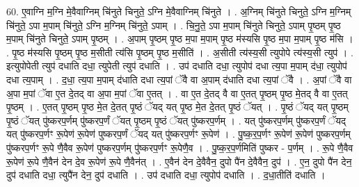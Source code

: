 \documentclass[17pt]{extarticle}
\begin{document}
60. ए॒वाग्नि म॒ग्नि मे॒वैवाग्निम् चि॑नुते चिनुते॒ ऽग्नि मे॒वैवाग्निम् चि॑नुते । . अ॒ग्निम् चि॑नुते चिनुते॒ ऽग्नि म॒ग्निम् चि॑नुते॒ ऽपा म॒पाम् चि॑नुते॒ ऽग्नि म॒ग्निम् चि॑नुते॒ ऽपाम् । . चि॒नु॒ते॒ ऽपा म॒पाम् चि॑नुते चिनुते॒ ऽपाम् पृ॒ष्ठम् पृ॒ष्ठ म॒पाम् चि॑नुते चिनुते॒ ऽपाम् पृ॒ष्ठम् । . अ॒पाम् पृ॒ष्ठम् पृ॒ष्ठ म॒पा म॒पाम् पृ॒ष्ठ म॑स्यसि पृ॒ष्ठ म॒पा म॒पाम् पृ॒ष्ठ म॑सि । . पृ॒ष्ठ म॑स्यसि पृ॒ष्ठम् पृ॒ष्ठ म॒सीती त्य॑सि पृ॒ष्ठम् पृ॒ष्ठ म॒सीति॑ । . अ॒सीती त्य॑स्य॒सी त्युपोपे त्य॑स्य॒सी त्युप॑ । . इत्युपोपेती त्युप॑ दधाति दधा॒ त्युपेती त्युप॑ दधाति । . उप॑ दधाति दधा॒ त्युपोप॑ दधा त्य॒पा म॒पाम् द॑धा॒ त्युपोप॑ दधा त्य॒पाम् । . द॒धा॒ त्य॒पा म॒पाम् द॑धाति दधा त्य॒पां ॅवै वा अ॒पाम् द॑धाति दधा त्य॒पां ॅवै । . अ॒पां ॅवै वा अ॒पा म॒पां ॅवा ए॒त दे॒तद् वा अ॒पा म॒पां ॅवा ए॒तत् । . वा ए॒त दे॒तद् वै वा ए॒तत् पृ॒ष्ठम् पृ॒ष्ठ मे॒तद् वै वा ए॒तत् पृ॒ष्ठम् । . ए॒तत् पृ॒ष्ठम् पृ॒ष्ठ मे॒त दे॒तत् पृ॒ष्ठं ॅयद् यत् पृ॒ष्ठ मे॒त दे॒तत् पृ॒ष्ठं ॅयत् । . पृ॒ष्ठं ॅयद् यत् पृ॒ष्ठम् पृ॒ष्ठं ॅयत् पु॑ष्करप॒र्णम् पु॑ष्करप॒र्णं ॅयत् पृ॒ष्ठम् पृ॒ष्ठं ॅयत् पु॑ष्करप॒र्णम् । . यत् पु॑ष्करप॒र्णम् पु॑ष्करप॒र्णं ॅयद् यत् पु॑ष्करप॒र्णꣳ रू॒पेण॑ रू॒पेण॑ पुष्करप॒र्णं ॅयद् यत् पु॑ष्करप॒र्णꣳ रू॒पेण॑ । . पु॒ष्क॒र॒प॒र्णꣳ रू॒पेण॑ रू॒पेण॑ पुष्करप॒र्णम् पु॑ष्करप॒र्णꣳ रू॒पे णै॒वैव रू॒पेण॑ पुष्करप॒र्णम् पु॑ष्करप॒र्णꣳ रू॒पेणै॒व । . पु॒ष्क॒र॒प॒र्णमिति॑ पुष्कर - प॒र्णम् । . रू॒पे णै॒वैव रू॒पेण॑ रू॒पे णै॒वैन॑ देन दे॒व रू॒पेण॑ रू॒पे णै॒वैन॑त् । . ए॒वैन॑ देन दे॒वैवैन॒ दुपो पै॑न दे॒वैवैन॒ दुप॑ । . ए॒न॒ दुपो पै॑न देन॒ दुप॑ दधाति दधा॒ त्युपै॑न देन॒ दुप॑ दधाति । . उप॑ दधाति दधा॒ त्युपोप॑ दधाति । . द॒धा॒तीति॑ दधाति । \newline
\pagebreak
{}
\end{document}
